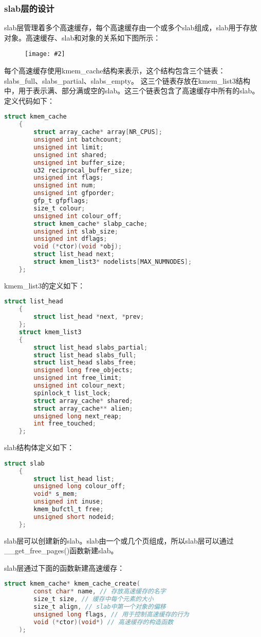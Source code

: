 \documentclass[a4paper,left=2.5cm,right=2.5cm,11pt]{article}
\newcommand{\sizedfic}[2]{\begin{figure}[H]
		\center
		\texttt{[image: \#2]}
	\end{figure}}
\begin{document}
\subsubsection{slab层的设计}
	slab层管理着多个高速缓存，每个高速缓存由一个或多个slab组成，slab用于存放对象。高速缓存、slab和对象的关系如下图所示：
	\sizedfic{0.9}{11.png}

	每个高速缓存使用kmem\_cache结构来表示，这个结构包含三个链表：slabs\_full、slabs\_partial、slabs\_empty。
	这三个链表存放在kmem\_list3结构中，用于表示满、部分满或空的slab。这三个链表包含了高速缓存中所有的slab。定义代码如下：
	\begin{lstlisting}[language = C]
	struct kmem_cache
	{
		struct array_cache* array[NR_CPUS];
		unsigned int batchcount;
		unsigned int limit;
		unsigned int shared;
		unsigned int buffer_size;
		u32 reciprocal_buffer_size;
		unsigned int flags;
		unsigned int num;
		unsigned int gfporder;
		gfp_t gfpflags;
		size_t colour;
		unsigned int colour_off;
		struct kmem_cache* slabp_cache;
		unsigned int slab_size;
		unsigned int dflags;
		void (*ctor)(void *obj);
		struct list_head next;
		struct kmem_list3* nodelists[MAX_NUMNODES];
	};
	\end{lstlisting}

	kmem\_list3的定义如下：
	\begin{lstlisting}[language = C]
	struct list_head
	{
		struct list_head *next, *prev;
	};
	struct kmem_list3
	{
		struct list_head slabs_partial;
		struct list_head slabs_full;
		struct list_head slabs_free;
		unsigned long free_objects;
		unsigned int free_limit;
		unsigned int colour_next;
		spinlock_t list_lock;
		struct array_cache* shared;
		struct array_cache** alien;
		unsigned long next_reap;
		int free_touched;
	};
	\end{lstlisting}

	slab结构体定义如下：
	\begin{lstlisting}[language = C]
	struct slab
	{
		struct list_head list;
		unsigned long colour_off;
		void* s_mem;
		unsigned int inuse;
		kmem_bufctl_t free;
		unsigned short nodeid;
	};
	\end{lstlisting}

	slab层可以创建新的slab。slab由一个或几个页组成，所以slab层可以通过\_\_get\_free\_pages()函数新建slab。\par
	slab层通过下面的函数新建高速缓存：
	\begin{lstlisting}[language = C]
	struct kmem_cache* kmem_cache_create(
		const char* name, // 存放高速缓存的名字
		size_t size, // 缓存中每个元素的大小
		size_t align, // slab中第一个对象的偏移
		unsigned long flags, // 用于控制高速缓存的行为
		void (*ctor)(void*) // 高速缓存的构造函数
	);
	\end{lstlisting}
\end{document}
